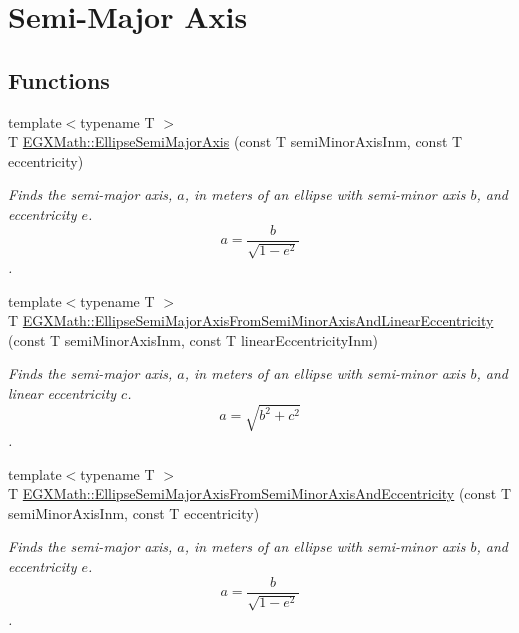\hypertarget{group___e_g_x_math-_geometry-2_d-_ellipse-_semi_major_axis}{}\section{Semi-\/\+Major Axis}
\label{group___e_g_x_math-_geometry-2_d-_ellipse-_semi_major_axis}
\subsection*{Functions}
\begin{DoxyCompactItemize}
\item 
{\footnotesize template$<$typename T $>$ }\\T \mbox{\hyperlink{group___e_g_x_math-_geometry-2_d-_ellipse-_semi_major_axis_ga646a2ca065f4ac3f666a9ea22f3bb527}{E\+G\+X\+Math\+::\+Ellipse\+Semi\+Major\+Axis}} (const T semi\+Minor\+Axis\+Inm, const T eccentricity)
\begin{DoxyCompactList}\small\item\em Finds the semi-\/major axis, $a$, in meters of an ellipse with semi-\/minor axis $b$, and eccentricity $e$. \[ a=\frac{b}{\sqrt{1-e^2}} \]. \end{DoxyCompactList}\item 
{\footnotesize template$<$typename T $>$ }\\T \mbox{\hyperlink{group___e_g_x_math-_geometry-2_d-_ellipse-_semi_major_axis_gaed0cc0b8da6cffa6cb9e28e773bc6e16}{E\+G\+X\+Math\+::\+Ellipse\+Semi\+Major\+Axis\+From\+Semi\+Minor\+Axis\+And\+Linear\+Eccentricity}} (const T semi\+Minor\+Axis\+Inm, const T linear\+Eccentricity\+Inm)
\begin{DoxyCompactList}\small\item\em Finds the semi-\/major axis, $a$, in meters of an ellipse with semi-\/minor axis $b$, and linear eccentricity $c$. \[ a=\sqrt{b^2+c^2} \]. \end{DoxyCompactList}\item 
{\footnotesize template$<$typename T $>$ }\\T \mbox{\hyperlink{group___e_g_x_math-_geometry-2_d-_ellipse-_semi_major_axis_ga505f404b0c1f4f73853c97e0a9ee2ef1}{E\+G\+X\+Math\+::\+Ellipse\+Semi\+Major\+Axis\+From\+Semi\+Minor\+Axis\+And\+Eccentricity}} (const T semi\+Minor\+Axis\+Inm, const T eccentricity)
\begin{DoxyCompactList}\small\item\em Finds the semi-\/major axis, $a$, in meters of an ellipse with semi-\/minor axis $b$, and eccentricity $e$. \[ a=\frac{b}{\sqrt{1-e^2}} \]. \end{DoxyCompactList}\item 

\end{DoxyCompactItemize}
